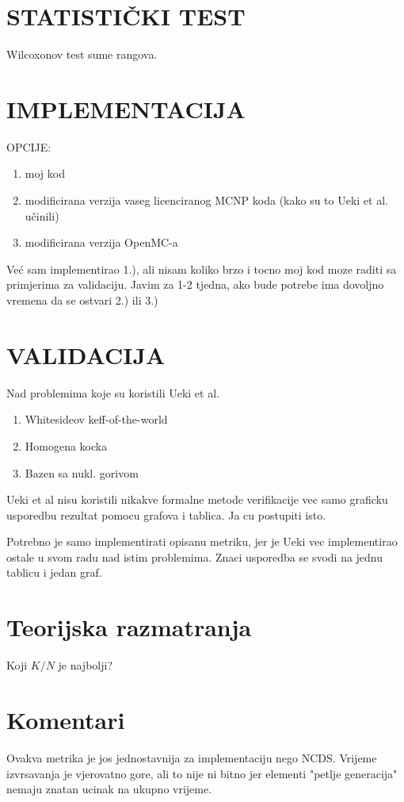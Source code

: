 \documentclass{report}
\begin{document}
\section{STATISTIČKI TEST}
Wilcoxonov test sume rangova.

\section{IMPLEMENTACIJA}
OPCIJE:
\begin{enumerate}[label=\arabic*)]
	\item moj kod
	\item modificirana verzija vaseg licenciranog MCNP koda (kako su to Ueki et al. učinili)
	\item modificirana verzija OpenMC-a
\end{enumerate}

Već sam implementirao 1.), ali nisam koliko brzo i tocno moj kod moze raditi sa primjerima za validaciju.
Javim za 1-2 tjedna, ako bude potrebe ima dovoljno vremena da se ostvari 2.) ili 3.)

\section{VALIDACIJA}
Nad problemima koje su koristili Ueki et al.
\begin{enumerate}
\item Whitesideov keff-of-the-world
\item Homogena kocka
\item Bazen sa nukl. gorivom
\end{enumerate}

Ueki et al nisu koristili nikakve formalne metode verifikacije
vec samo graficku usporedbu rezultat pomocu grafova i tablica.
Ja cu postupiti isto.

Potrebno je samo implementirati opisanu metriku, jer je Ueki vec
implementirao ostale u svom radu nad istim problemima.
Znaci usporedba se svodi na jednu tablicu i jedan graf.

\section{Teorijska razmatranja}
Koji $K/N$ je najbolji?



\pagebreak
\section*{Komentari}
Ovakva metrika je jos jednostavnija za implementaciju nego NCDS.
Vrijeme izvrsavanja je vjerovatno gore, ali to nije ni bitno jer elementi "petlje generacija"
nemaju znatan ucinak na ukupno vrijeme.
\end{document}
